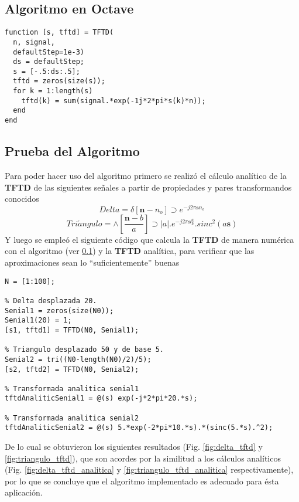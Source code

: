 \documentclass[letterpaper, 10 pt, conference]{ieeeconf}  %
\begin{document}
\subsection{Algoritmo en Octave}
\label{tftd_function}
\begin{lstlisting}[style=Matlab-editor] 
function [s, tftd] = TFTD(
  n, signal,
  defaultStep=1e-3)
  ds = defaultStep;
  s = [-.5:ds:.5];
  tftd = zeros(size(s));
  for k = 1:length(s)
    tftd(k) = sum(signal.*exp(-1j*2*pi*s(k)*n));
  end
end
\end{lstlisting}

\subsection{Prueba del Algoritmo}
Para poder hacer uso del algoritmo primero se realiz\'o el c\'alculo analítico de la \textbf{TFTD} de las siguientes se\~{n}ales a partir de propiedades y pares transformandos conocidos
\[
  Delta = \delta[\textbf{n}-n_o] \supset e^{-j2{\pi}\textbf{s}n_o}
\]
\[
  Tri\acute{a}ngulo = \wedge[\frac{\textbf{n}-b}{a}] \supset |a|.e^{-j2{\pi}\textbf{s}\frac{a}{b}}.sinc^2(a\textbf{s})
\]
Y luego se emple\'o el siguiente c\'odigo que calcula la \textbf{TFTD} de manera num\'erica con el algoritmo (ver \ref{tftd_function}) y la \textbf{TFTD} anal\'itica, para verificar que las aproximaciones sean lo ``suficientemente'' buenas

\begin{lstlisting}[style=Matlab-editor]
N = [1:100];

% Delta desplazada 20.
Senial1 = zeros(size(N0));
Senial1(20) = 1;
[s1, tftd1] = TFTD(N0, Senial1);

% Triangulo desplazado 50 y de base 5.
Senial2 = tri((N0-length(N0)/2)/5);
[s2, tftd2] = TFTD(N0, Senial2);

% Transformada analitica senial1
tftdAnaliticSenial1 = @(s) exp(-j*2*pi*20.*s);

% Transformada analitica senial2
tftdAnaliticSenial2 = @(s) 5.*exp(-2*pi*10.*s).*(sinc(5.*s).^2);

\end{lstlisting}

De lo cual se obtuvieron los siguientes resultados (Fig. \ref{fig:delta_tftd} y \ref{fig:triangulo_tftd}), que son acordes por la similitud a los c\'alculos analíticos (Fig. \ref{fig:delta_tftd_analitica} y \ref{fig:triangulo_tftd_analitica} respectivamente), por lo que se concluye que el algoritmo implementado es adecuado para \'esta aplicaci\'on.
\end{document}
